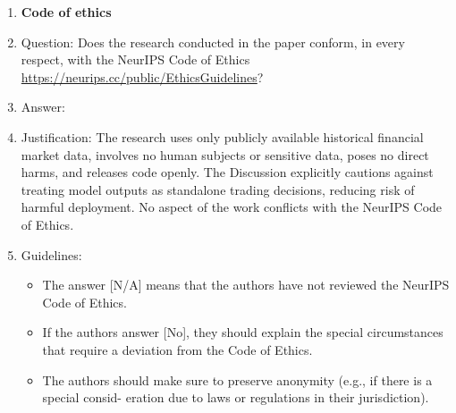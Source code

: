 \documentclass{article}
\begin{document}
\begin{enumerate}
\item {\bf Code of ethics}
    \item[] Question: Does the research conducted in the paper conform, in every respect, with the
NeurIPS Code of Ethics \url{https://neurips.cc/public/EthicsGuidelines}?
    \item[] Answer: \answerYes{}
    \item[] Justification: The research uses only publicly available historical financial market data,
    involves no human subjects or sensitive data, poses no direct harms, and releases code
    openly. The Discussion explicitly cautions against treating model outputs as standalone
    trading decisions, reducing risk of harmful deployment. No aspect of the work conflicts
    with the NeurIPS Code of Ethics.
    \item[] Guidelines:
    \begin{itemize}
        \item The answer [N/A] means that the authors have not reviewed the NeurIPS Code of
Ethics.
        \item If the authors answer [No], they should explain the special circumstances that require a
deviation from the Code of Ethics.
        \item The authors should make sure to preserve anonymity (e.g., if there is a special consid-
eration due to laws or regulations in their jurisdiction).
    \end{itemize}


\end{enumerate}
\end{document}
